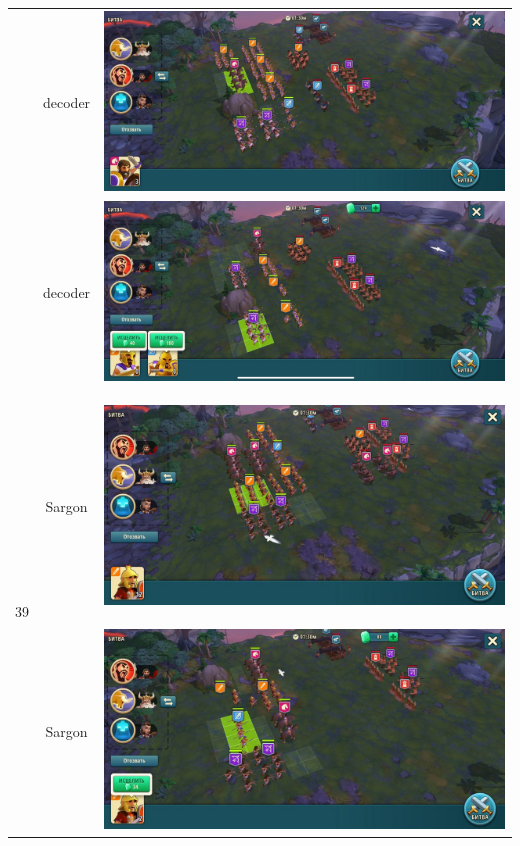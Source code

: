 \begin{longtable}{|c|c|c|}
	& decoder &
	\includegraphics[width=0.75\linewidth]{./parts/media/TreasureHunt/38/decoder/photo_2022-04-07_10-10-01.jpg} \\
	& decoder &
	\includegraphics[width=0.75\linewidth]{./parts/media/TreasureHunt/38/decoder/photo_2022-04-07_10-10-19.jpg} \\
	\hline
	\multirow{11}{*}{39} & Sargon &
	\hypertarget{fight39}{\includegraphics[width=0.75\linewidth]{./parts/media/TreasureHunt/39/sargon/photo_2022-04-07_13-18-09.jpg}} \\
	& Sargon &
	\includegraphics[width=0.75\linewidth]{./parts/media/TreasureHunt/39/sargon/photo_2022-04-07_13-18-26.jpg} \\

\end{longtable}
